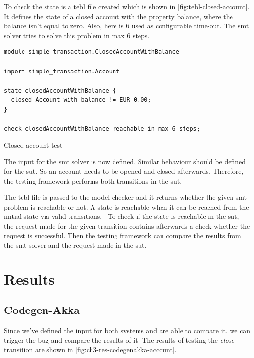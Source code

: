 To check the state is a tebl file created which is shown in
\autoref{fig:tebl-closed-account}. It defines the state of a closed account with
the property balance, where the balance isn't equal to zero. Also, here is 6
used as configurable time-out. The \gls{smt} solver tries to solve this problem in
max 6 steps.

\begin{sourcecode}[h!]
\begin{lstlisting}[]
module simple_transaction.ClosedAccountWithBalance

import simple_transaction.Account

state closedAccountWithBalance {
  closed Account with balance != EUR 0.00;
}

check closedAccountWithBalance reachable in max 6 steps;
\end{lstlisting}
\caption{Closed account test}\label{fig:tebl-closed-account}
\end{sourcecode}
\FloatBarrier

The input for the \gls{smt} solver is now defined. Similar behaviour should be defined
for the \gls{sut}. So an account needs to be opened and closed
afterwards. Therefore, the testing framework performs both transitions in the
\gls{sut}.

The tebl file is passed to the model checker and it returns whether the given
\gls{smt} problem is reachable or not. A state is reachable when it can be reached
from the initial state via valid
transitions.~\cite[p.~4]{stoel_storm_vinju_bosman_2016} To check if the state is
reachable in the \gls{sut}, the request made for the given transition
contains afterwards a check whether the request is successful. Then the testing
framework can compare the results from the \gls{smt} solver and the request made in
the \gls{sut}.

\section{Results}

\subsection{Codegen-Akka}

Since we've defined the input for both systems and are able to compare it, we
can trigger the bug and compare the results of it. The results of testing the
\textit{close} transition are shown in \autoref{fig:ch3-res-codegenakka-account}.

